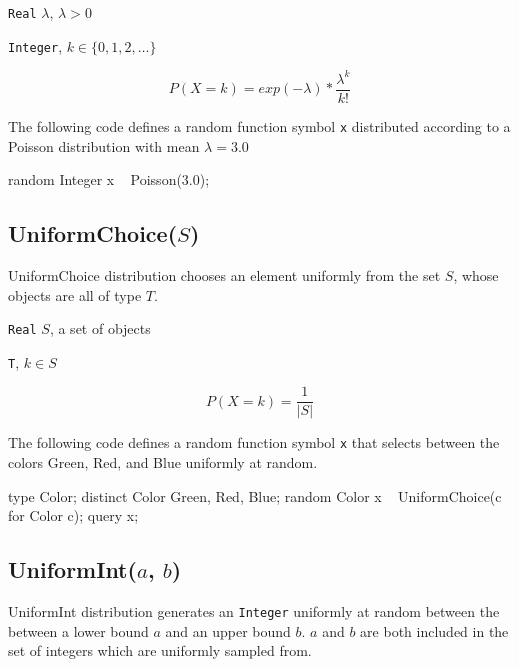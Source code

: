 \begin{itemize*}
\item[] \verb|Real| $\lambda$, $\lambda > 0$ 
\end{itemize*}

\begin{itemize*}
\item[] \verb|Integer|, $k \in \{0, 1, 2, \ldots \}$ 
\end{itemize*}

\[
	P(X = k) = exp(-\lambda) * \frac{\lambda^{k}}{k!}
\]

The following code defines a random function symbol \verb|x| distributed according to a Poisson distribution with mean $\lambda = 3.0$
\begin{blogcode}
random Integer x ~ Poisson(3.0);
\end{blogcode}


\subsection{UniformChoice($S$)} 
\label{uniformchoice-appexdix}

UniformChoice distribution chooses an element uniformly from the set $S$, whose objects are all of type $T$.

\begin{itemize*}
\item[] \verb|Real| $S$, a set of objects 
\end{itemize*}

\begin{itemize*}
\item[] \verb|T|, $k \in S$ 
\end{itemize*}

\[
	P(X = k) = \frac{1}{|S|}
\]

The following code defines a random function symbol \verb|x| that selects between the colors Green, Red, and Blue uniformly at random.

\begin{blogcode}
type Color;
distinct Color Green, Red, Blue;
random Color x ~ UniformChoice({c for Color c});
query x;
\end{blogcode}

\subsection{UniformInt($a$, $b$)} \label{uniformint-section}
UniformInt distribution generates an \verb|Integer| uniformly at random between the between a lower bound $a$ and an upper bound $b$. $a$ and $b$ are both included in the set of integers which are uniformly sampled from.

